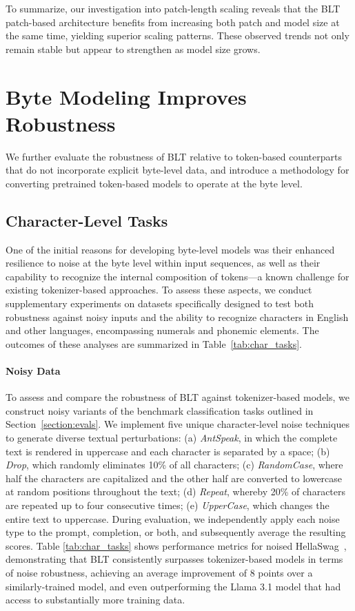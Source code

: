To summarize, our investigation into patch-length scaling reveals that the {\textsc BLT} patch-based architecture benefits from increasing both patch and model size at the same time, yielding superior scaling patterns. These observed trends not only remain stable but appear to strengthen as model size grows.

\section{Byte Modeling Improves Robustness} We further evaluate the robustness of {\textsc BLT} relative to token-based counterparts that do not incorporate explicit byte-level data, and introduce a methodology for converting pretrained token-based models to operate at the byte level.
\label{sec:robustness}

\subsection{Character-Level Tasks}

One of the initial reasons for developing byte-level models was their enhanced resilience to noise at the byte level within input sequences, as well as their capability to recognize the internal composition of tokens—a known challenge for existing tokenizer-based approaches. To assess these aspects, we conduct supplementary experiments on datasets specifically designed to test both robustness against noisy inputs and the ability to recognize characters in English and other languages, encompassing numerals and phonemic elements. The outcomes of these analyses are summarized in Table~\ref{tab:char_tasks}.

\paragraph{Noisy Data} To assess and compare the robustness of {\textsc BLT} against tokenizer-based models, we construct noisy variants of the benchmark classification tasks outlined in Section~\ref{section:evals}. We implement five unique character-level noise techniques to generate diverse textual perturbations: (a) \textit{AntSpeak}, in which the complete text is rendered in uppercase and each character is separated by a space; (b) \textit{Drop}, which randomly eliminates 10\% of all characters; (c) \textit{RandomCase}, where half the characters are capitalized and the other half are converted to lowercase at random positions throughout the text; (d) \textit{Repeat}, whereby 20\% of characters are repeated up to four consecutive times; (e) \textit{UpperCase}, which changes the entire text to uppercase. During evaluation, we independently apply each noise type to the prompt, completion, or both, and subsequently average the resulting scores. Table \ref{tab:char_tasks} shows performance metrics for noised HellaSwag~\citep{Eval_hellaswag}, demonstrating that {\textsc BLT} consistently surpasses tokenizer-based models in terms of noise robustness, achieving an average improvement of 8 points over a similarly-trained model, and even outperforming the Llama 3.1 model that had access to substantially more training data.


